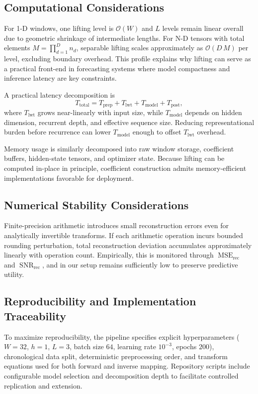 \documentclass[journal]{IEEEtran}
\begin{document}
\subsection{Computational Considerations}
For 1-D windows, one lifting level is $\mathcal{O}(W)$ and $L$ levels remain linear overall due to geometric shrinkage of intermediate lengths. For N-D tensors with total elements $M=\prod_{d=1}^{D}n_d$, separable lifting scales approximately as $\mathcal{O}(D\,M)$ per level, excluding boundary overhead. This profile explains why lifting can serve as a practical front-end in forecasting systems where model compactness and inference latency are key constraints.

A practical latency decomposition is
\begin{equation}
T_{\text{total}}=T_{\text{prep}}+T_{\text{lwt}}+T_{\text{model}}+T_{\text{post}},
\end{equation}
where $T_{\text{lwt}}$ grows near-linearly with input size, while $T_{\text{model}}$ depends on hidden dimension, recurrent depth, and effective sequence size. Reducing representational burden before recurrence can lower $T_{\text{model}}$ enough to offset $T_{\text{lwt}}$ overhead.

Memory usage is similarly decomposed into raw window storage, coefficient buffers, hidden-state tensors, and optimizer state. Because lifting can be computed in-place in principle, coefficient construction admits memory-efficient implementations favorable for deployment.

\subsection{Numerical Stability Considerations}
Finite-precision arithmetic introduces small reconstruction errors even for analytically invertible transforms. If each arithmetic operation incurs bounded rounding perturbation, total reconstruction deviation accumulates approximately linearly with operation count. Empirically, this is monitored through $\operatorname{MSE}_{\text{rec}}$ and $\operatorname{SNR}_{\text{rec}}$, and in our setup remains sufficiently low to preserve predictive utility.

\subsection{Reproducibility and Implementation Traceability}
To maximize reproducibility, the pipeline specifies explicit hyperparameters ($W=32$, $h=1$, $L=3$, batch size $64$, learning rate $10^{-3}$, epochs $200$), chronological data split, deterministic preprocessing order, and transform equations used for both forward and inverse mapping. Repository scripts include configurable model selection and decomposition depth to facilitate controlled replication and extension.
\end{document}
